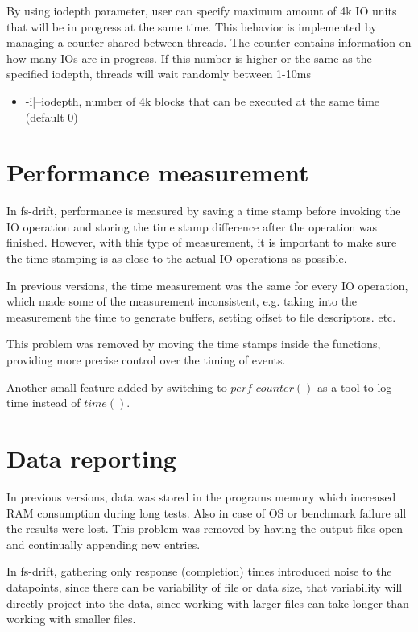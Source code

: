 \documentclass[
  color, %
  table, %
  lof,   %
  lot,   %
]{fithesis3}
\begin{document}
By using iodepth parameter, user can specify maximum amount of 4k IO units that will be in progress at the same time. This behavior is implemented by managing a counter shared between threads. The counter contains information on how many IOs are in progress. If this number is higher or the same as the specified iodepth, threads will wait randomly between 1-10ms%

\begin{itemize}
    \item -i|--iodepth, number of 4k blocks that can be executed at the same time (default 0)
\end{itemize}


\section{Performance measurement}
In fs-drift, performance is measured by saving a time stamp before invoking the IO operation and storing the time stamp difference after the operation was finished. However, with this type of measurement, it is important to make sure the time stamping is as close to the actual IO operations as possible. 

In previous versions, the time measurement was the same for every IO operation, which made some of the measurement inconsistent, e.g. taking into the measurement the time to generate buffers, setting offset to file descriptors. etc.

This problem was removed by moving the time stamps inside the functions, providing more precise control over the timing of events.

Another small feature added by switching to $perf\_counter()$ as a tool to log time instead of $time()$.


\section{Data reporting}
In previous versions, data was stored in the programs memory which increased RAM consumption during long tests. Also in case of OS or benchmark failure all the results were lost. This problem was removed by having the output files open and continually appending new entries.

In fs-drift, gathering only response (completion) times introduced noise to the datapoints, since there can be variability of file or data size, that variability will directly project into the data, since working with larger files can take longer than working with smaller files.
\end{document}
